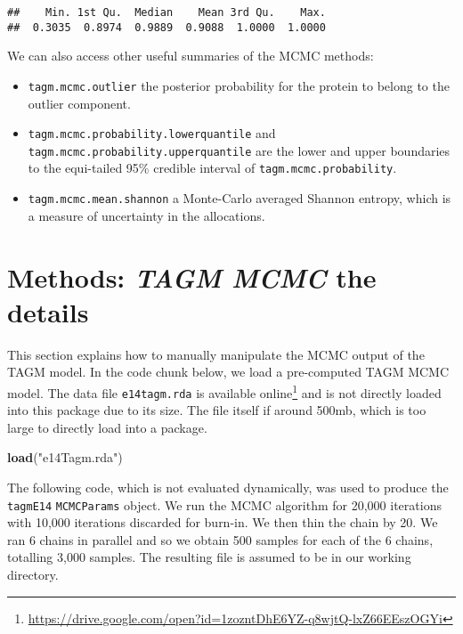 \documentclass[9pt,a4paper,]{extarticle}
\newenvironment{Shaded}{\begin{snugshade}}{\end{snugshade}}
\newcommand{\KeywordTok}[1]{\textcolor[rgb]{0.13,0.29,0.53}{\textbf{#1}}}
\newcommand{\NormalTok}[1]{#1}
\newcommand{\StringTok}[1]{\textcolor[rgb]{0.31,0.60,0.02}{#1}}
\begin{document}
\begin{verbatim}
##    Min. 1st Qu.  Median    Mean 3rd Qu.    Max. 
##  0.3035  0.8974  0.9889  0.9088  1.0000  1.0000
\end{verbatim}

We can also access other useful summaries of the MCMC methods:

\begin{itemize}
\item
  \texttt{tagm.mcmc.outlier} the posterior probability for the protein
  to belong to the outlier component.
\item
  \texttt{tagm.mcmc.probability.lowerquantile} and \texttt{tagm.mcmc.probability.upperquantile}
  are the lower and upper boundaries to the equi-tailed 95\% credible interval
  of \texttt{tagm.mcmc.probability}.
\item
  \texttt{tagm.mcmc.mean.shannon} a Monte-Carlo averaged Shannon entropy,
  which is a measure of uncertainty in the allocations.
\end{itemize}

\hypertarget{methods-tagm-mcmc-the-details}{%
\section{\texorpdfstring{Methods: \emph{TAGM MCMC} the details}{Methods: TAGM MCMC the details}}\label{methods-tagm-mcmc-the-details}}

This section explains how to manually manipulate the MCMC output of
the TAGM model. In the code chunk below, we load a pre-computed
TAGM MCMC model. The data file \texttt{e14tagm.rda} is available online\footnote{\url{https://drive.google.com/open?id=1zozntDhE6YZ-q8wjtQ-lxZ66EEszOGYi}}
and is not directly loaded into this package due to its size. The file
itself if around 500mb, which is too large to directly load into a package.

\begin{Shaded}
\begin{Highlighting}[]
\KeywordTok{load}\NormalTok{(}\StringTok{"e14Tagm.rda"}\NormalTok{)}
\end{Highlighting}
\end{Shaded}

The following code, which is not evaluated dynamically, was used to
produce the \texttt{tagmE14} \texttt{MCMCParams} object. We run the MCMC algorithm
for 20,000 iterations with 10,000 iterations discarded for burn-in. We
then thin the chain by 20. We ran 6 chains in parallel and so we
obtain 500 samples for each of the 6 chains, totalling 3,000
samples. The resulting file is assumed to be in our working directory.
\end{document}

